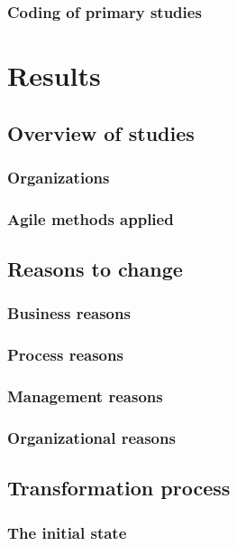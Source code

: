 \documentclass{article}
\begin{document}
\subsubsection{Coding of primary studies}

\section{Results}

\subsection{Overview of studies}

\subsubsection{Organizations}

\subsubsection{Agile methods applied}

\subsection{Reasons to change}

\subsubsection{Business reasons}

\subsubsection{Process reasons}

\subsubsection{Management reasons}

\subsubsection{Organizational reasons}

\subsection{Transformation process}

\subsubsection{The initial state}

\end{document}
